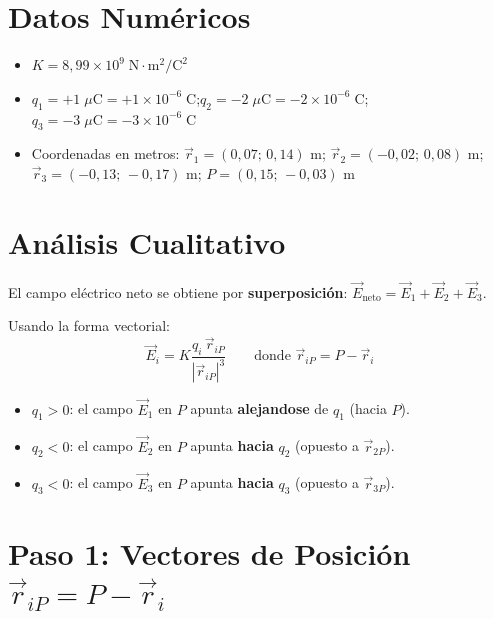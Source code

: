 \documentclass[12pt,letterpaper]{article}
\begin{document}
\section*{Datos Num\'ericos}

\begin{itemize}
    \item $K = 8{,}99 \times 10^9\;\text{N}\cdot\text{m}^2/\text{C}^2$
    \item $q_1 = +1\;\mu\text{C} = +1\times10^{-6}\;\text{C}$;\quad $q_2 = -2\;\mu\text{C} = -2\times10^{-6}\;\text{C}$;\quad $q_3 = -3\;\mu\text{C} = -3\times10^{-6}\;\text{C}$
    \item Coordenadas en metros: $\vec{r}_1=(0{,}07;\,0{,}14)$ m;\; $\vec{r}_2=(-0{,}02;\,0{,}08)$ m;\; $\vec{r}_3=(-0{,}13;\,-0{,}17)$ m;\; $P=(0{,}15;\,-0{,}03)$ m
\end{itemize}

\section*{An\'alisis Cualitativo}

El campo el\'ectrico neto se obtiene por \textbf{superposici\'on}:
$\vec{E}_{\text{neto}} = \vec{E}_1 + \vec{E}_2 + \vec{E}_3$.

Usando la forma vectorial:
\begin{equation*}
    \vec{E}_i = K \frac{q_i\,\vec{r}_{iP}}{|\vec{r}_{iP}|^3}
    \qquad \text{donde } \vec{r}_{iP} = P - \vec{r}_i
\end{equation*}

\begin{itemize}
    \item $q_1 > 0$: el campo $\vec{E}_1$ en $P$ apunta \textbf{alejandose} de $q_1$ (hacia $P$).
    \item $q_2 < 0$: el campo $\vec{E}_2$ en $P$ apunta \textbf{hacia} $q_2$ (opuesto a $\vec{r}_{2P}$).
    \item $q_3 < 0$: el campo $\vec{E}_3$ en $P$ apunta \textbf{hacia} $q_3$ (opuesto a $\vec{r}_{3P}$).
\end{itemize}

\section*{Paso 1: Vectores de Posici\'on $\vec{r}_{iP} = P - \vec{r}_i$}
\end{document}

